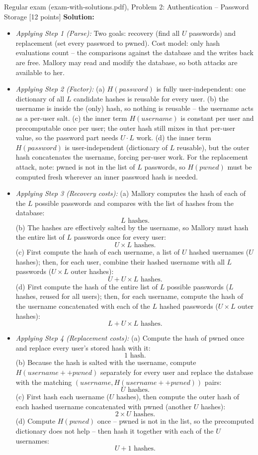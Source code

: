\documentclass[12pt, a4paper]{article}
\begin{document}
\begin{practicebox}{Regular exam (exam-with-solutions.pdf), Problem 2: Authentication -- Password Storage [12 points]}
\textbf{Solution:}
\begin{itemize}
    \item \textit{Applying Step 1 (Parse):} Two goals: recovery (find all $U$ passwords) and replacement (set every password to pwned). Cost model: only hash evaluations count -- the comparisons against the database and the writes back are free. Mallory may read and modify the database, so both attacks are available to her.
    \item \textit{Applying Step 2 (Factor):} (a) $H(password)$ is fully user-independent: one dictionary of all $L$ candidate hashes is reusable for every user. (b) the username is inside the (only) hash, so nothing is reusable -- the username acts as a per-user salt. (c) the inner term $H(username)$ is constant per user and precomputable once per user; the outer hash still mixes in that per-user value, so the password part needs $U \cdot L$ work. (d) the inner term $H(password)$ is user-independent (dictionary of $L$ reusable), but the outer hash concatenates the username, forcing per-user work. For the replacement attack, note: pwned is not in the list of $L$ passwords, so $H(pwned)$ must be computed fresh wherever an inner password hash is needed.
    \item \textit{Applying Step 3 (Recovery costs):} (a) Mallory computes the hash of each of the $L$ possible passwords and compares with the list of hashes from the database: \[ L \text{ hashes.} \] (b) The hashes are effectively salted by the username, so Mallory must hash the entire list of $L$ passwords once for every user: \[ U \times L \text{ hashes.} \] (c) First compute the hash of each username, a list of $U$ hashed usernames ($U$ hashes); then, for each user, combine their hashed username with all $L$ passwords ($U \times L$ outer hashes): \[ U + U \times L \text{ hashes.} \] (d) First compute the hash of the entire list of $L$ possible passwords ($L$ hashes, reused for all users); then, for each username, compute the hash of the username concatenated with each of the $L$ hashed passwords ($U \times L$ outer hashes): \[ L + U \times L \text{ hashes.} \]
    \item \textit{Applying Step 4 (Replacement costs):} (a) Compute the hash of pwned once and replace every user's stored hash with it: \[ 1 \text{ hash.} \] (b) Because the hash is salted with the username, compute $H(username ++ pwned)$ separately for every user and replace the database with the matching $(username, H(username ++ pwned))$ pairs: \[ U \text{ hashes.} \] (c) First hash each username ($U$ hashes), then compute the outer hash of each hashed username concatenated with pwned (another $U$ hashes): \[ 2 \times U \text{ hashes.} \] (d) Compute $H(pwned)$ once -- pwned is not in the list, so the precomputed dictionary does not help -- then hash it together with each of the $U$ usernames: \[ U + 1 \text{ hashes.} \]

\end{itemize}
\end{practicebox}
\end{document}
